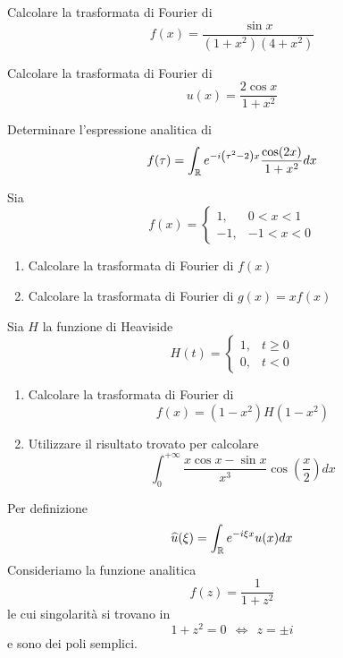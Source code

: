 Calcolare la trasformata di Fourier di
\begin{equation*}
f(x) = \frac{\sin x}{\left(1 + x^{2}\right)\left(4 + x^{2}\right)}
\end{equation*}
\Esercizio{}

Calcolare la trasformata di Fourier di
\begin{equation*}
u(x) = \frac{2\cos x}{1 + x^{2}}
\end{equation*}
\Esercizio{}

Determinare l'espressione analitica di
\begin{equation*}
f(\tau) = \int_{\mathbb{R}} e^{- i\left(\tau^{2} - 2\right) x}\frac{\cos(2x)}{1 + x^{2}} dx
\end{equation*}
\Esercizio{}

Sia
\begin{equation*}
f(x) =
\begin{cases}
1, & 0 < x < 1\\
- 1, & - 1 < x < 0
\end{cases}
\end{equation*}
\begin{enumerate}
\item Calcolare la trasformata di Fourier di $f(x)$
\item Calcolare la trasformata di Fourier di $g(x) = xf(x)$
\end{enumerate}
\Esercizio{}

Sia $H$ la funzione di Heaviside
\begin{equation*}
H(t) =
\begin{cases}
1, & t \geq 0\\
0, & t < 0
\end{cases}
\end{equation*}
\begin{enumerate}
\item Calcolare la trasformata di Fourier di
\begin{equation*}
f(x) = \left(1 - x^{2}\right) H\left(1 - x^{2}\right)
\end{equation*}
\item Utilizzare il risultato trovato per calcolare
\begin{equation*}
\int^{+ \infty}_{0}\frac{x\cos x - \sin x}{x^{3}}\cos\left(\frac{x}{2}\right) dx
\end{equation*}
\end{enumerate}
\ParteSoluzioni
\Soluzione

Per definizione
\begin{equation*}
\widehat{u}(\xi) = \int_{\mathbb{R}} e^{- i\xi x} u(x) dx
\end{equation*}
Consideriamo la funzione analitica
\begin{equation*}
f(z) = \frac{1}{1 + z^{2}}
\end{equation*}
le cui singolarità si trovano in
\begin{equation*}
1 + z^{2} = 0\ \ \iff \ \ z = \pm i
\end{equation*}
e sono dei poli semplici.


